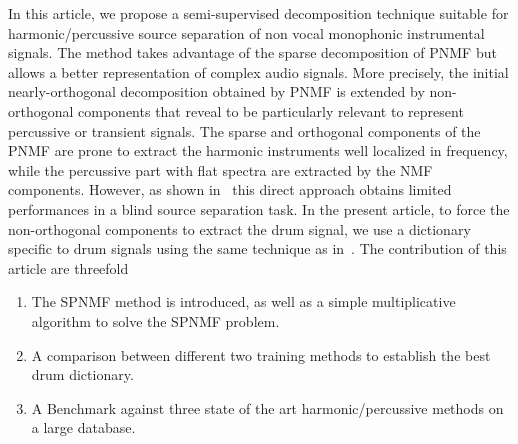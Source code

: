 In this article, we propose a semi-supervised decomposition technique suitable for harmonic/percussive source separation of non vocal monophonic instrumental signals. The method takes advantage of the sparse decomposition of PNMF but allows a better representation of complex audio signals. More precisely, the initial nearly-orthogonal decomposition obtained by PNMF is extended by non-orthogonal components that reveal to be particularly relevant to represent percussive or transient signals. The sparse and orthogonal components of the PNMF are prone to extract the harmonic instruments well localized in frequency, while the percussive part with flat spectra are extracted by the NMF components. However, as shown in~\cite{laroche2015structured} this direct approach obtains limited performances in a blind source separation task. In the present article, to force the non-orthogonal components to extract the drum signal, we use a dictionary specific to drum signals using the same technique as in~\cite{wudrum}.
The contribution of this article are threefold
\begin{enumerate}
\item The SPNMF method is introduced, as well as a simple multiplicative algorithm to solve the SPNMF problem.
\item  A comparison between different two training methods to establish the best drum dictionary.
\item A Benchmark against three state of the art harmonic/percussive methods on a large database.	
\end{enumerate}

